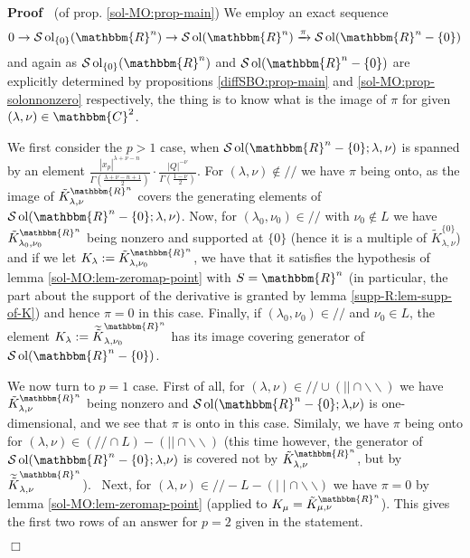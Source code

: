 \documentclass[12pt]{article}
\newcommand{\assign}{:=}
\newcommand{\comma}{{,}}
\newcommand{\nin}{\not\in}
\newcommand{\tmop}[1]{\ensuremath{\operatorname{#1}}}
\newcommand{\um}{-}
\renewenvironment{proof}{\noindent\textbf{Proof\ }}{\hspace*{\fill}$\Box$\medskip}
\theoremstyle{remark}
\begin{document}
\begin{proof}
  (of prop. \ref{sol-MO:prop-main}) We employ an exact sequence
  \[ 0 \rightarrow \mathcal{S} \tmop{ol}_{\{ 0 \}} (\mathbbm{R}^n) \rightarrow
     \mathcal{S} \tmop{ol} (\mathbbm{R}^n) \xrightarrow{\pi} \mathcal{S}
     \tmop{ol} (\mathbbm{R}^n \um \{ 0 \}) \]
  and again as $\mathcal{S} \tmop{ol}_{\{ 0 \}} (\mathbbm{R}^n)$ and
  $\mathcal{S} \tmop{ol} (\mathbbm{R}^n \um \{ 0 \})$ are explicitly
  determined by propositions \ref{diffSBO:prop-main} and
  \ref{sol-MO:prop-solonnonzero} respectively, the thing is to know what is
  the image of $\pi$ for given $(\lambda, \nu) \in \mathbbm{C}^2$.
  
  We first consider the $p > 1$ case, when $\mathcal{S} \tmop{ol}
  (\mathbbm{R}^n - \{ 0 \} ; \lambda, \nu)$ is spanned by an element $\frac{|
  x_p |^{\lambda + \nu - n}}{\Gamma \left( \frac{\lambda + \nu - n + 1}{2}
  \right)} \cdot \frac{| Q |^{- \nu}}{\Gamma \left( \frac{1 - \nu}{2}
  \right)}$. For $(\lambda, \nu) \nin / /$ we have $\pi$ being onto, as the
  image of $\tilde{K}_{\lambda, \nu}^{\mathbbm{R}^n}$ covers the generating
  elements of $\mathcal{S} \tmop{ol} (\mathbbm{R}^n - \{ 0 \} ; \lambda,
  \nu)$. Now, for $(\lambda_0, \nu_0) \in / /$ with $\nu_0 \nin L$ we have
  $\tilde{K}_{\lambda_0, \nu_0}^{\mathbbm{R}^n}$ being nonzero and supported
  at $\{ 0 \}$ (hence it is a multiple of $\tilde{K}_{\lambda, \nu}^{\{ 0
  \}}$) and if we let $K_{\lambda} \assign \tilde{K}_{\lambda,
  \nu_0}^{\mathbbm{R}^n}$, we have that it satisfies the hypothesis of lemma
  \ref{sol-MO:lem-zeromap-point} with $S =\mathbbm{R}^n$ (in particular, the
  part about the support of the derivative is granted by lemma
  \ref{supp-R:lem-supp-of-K}) and hence $\pi = 0$ in this case. Finally, if
  $(\lambda_0, \nu_0) \in / /$ and $\nu_0 \in L$, the element $K_{\lambda}
  \assign \widetilde{\tilde{K}}_{\lambda, \nu_0}^{\mathbbm{R}^n}$ has its
  image covering generator of $\mathcal{S} \tmop{ol} (\mathbbm{R}^n \um \{ 0
  \})$.
  
  We now turn to $p = 1$ case. First of all, for $(\lambda, \nu) \in / / \cup
  (| | \cap \backslash\backslash)$ we have $\tilde{K}_{\lambda,
  \nu}^{\mathbbm{R}^n}$ being nonzero and $\mathcal{S} \tmop{ol}
  (\mathbbm{R}^n - \{ 0 \} ; \lambda \comma \nu)$ is one-dimensional, and we
  see that $\pi$ is onto in this case. Similaly, we have $\pi$ being onto for
  $(\lambda, \nu) \in (/ / \cap L) - (| | \cap \backslash\backslash)$ (this
  time however, the generator of $\mathcal{S} \tmop{ol} (\mathbbm{R}^n - \{ 0
  \} ; \lambda \comma \nu)$ is covered not by $\tilde{K}_{\lambda,
  \nu}^{\mathbbm{R}^n}$, but by $\widetilde{\tilde{K}}_{\lambda,
  \nu}^{\mathbbm{R}^n}$). \ Next, for $(\lambda, \nu) \in / / - L - (\mid
  \mid \cap \backslash\backslash)$ we have $\pi = 0$ by lemma
  \ref{sol-MO:lem-zeromap-point} (applied to $K_{\mu} = \tilde{K}_{\mu,
  \nu}^{\mathbbm{R}^n}$). This gives the first two rows of an answer for $p =
  2$ given in the statement.
  

\end{proof}
\end{document}
